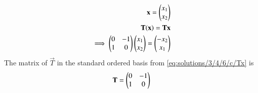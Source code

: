 \begin{align}
   \mathbf{x}=\begin{pmatrix}x_1\\x_2\end{pmatrix}\\
   \mathbf{T}(\mathbf{x})=\mathbf{T}\mathbf{x}\\
   \implies\begin{pmatrix}0&-1\\1&0\end{pmatrix}\begin{pmatrix}x_1\\x_2\end{pmatrix}=\begin{pmatrix}-x_2\\x_1\end{pmatrix}
   \end{align}
The matrix of $\vec{T}$ in the standard ordered basis from \eqref{eq:solutions/3/4/6/c/Tx} is 
 \begin{align}   
   \mathbf{T}=\begin{pmatrix}0&-1\\1&0\end{pmatrix}
\end{align}

